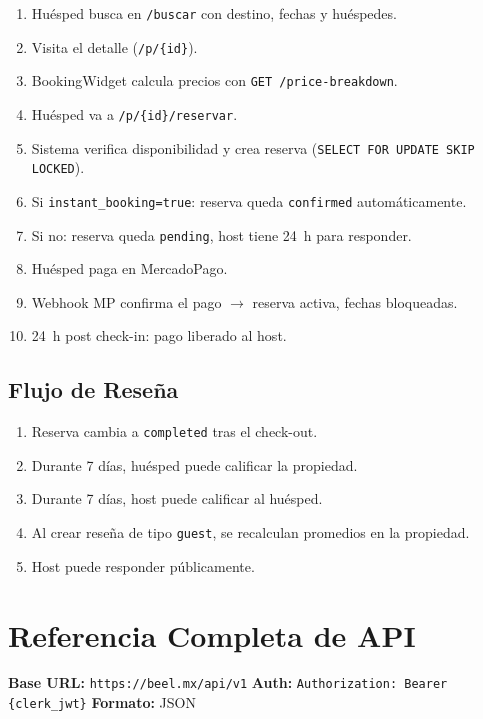 \documentclass[12pt,a4paper]{report}
\begin{document}
\begin{enumerate}[leftmargin=*]
  \item Hu\'esped busca en \texttt{/buscar} con destino, fechas y hu\'espedes.
  \item Visita el detalle (\texttt{/p/\{id\}}).
  \item BookingWidget calcula precios con \texttt{GET /price-breakdown}.
  \item Hu\'esped va a \texttt{/p/\{id\}/reservar}.
  \item Sistema verifica disponibilidad y crea reserva (\texttt{SELECT FOR UPDATE SKIP LOCKED}).
  \item Si \texttt{instant\_booking=true}: reserva queda \texttt{confirmed} autom\'aticamente.
  \item Si no: reserva queda \texttt{pending}, host tiene 24~h para responder.
  \item Hu\'esped paga en MercadoPago.
  \item Webhook MP confirma el pago $\rightarrow$ reserva activa, fechas bloqueadas.
  \item 24~h post check-in: pago liberado al host.
\end{enumerate}

\section{Flujo de Rese\~na}

\begin{enumerate}[leftmargin=*]
  \item Reserva cambia a \texttt{completed} tras el check-out.
  \item Durante 7 d\'ias, hu\'esped puede calificar la propiedad.
  \item Durante 7 d\'ias, host puede calificar al hu\'esped.
  \item Al crear rese\~na de tipo \texttt{guest}, se recalculan promedios en la propiedad.
  \item Host puede responder p\'ublicamente.
\end{enumerate}

\chapter{Referencia Completa de API}

\textbf{Base URL:} \texttt{https://beel.mx/api/v1} \quad
\textbf{Auth:} \texttt{Authorization: Bearer \{clerk\_jwt\}} \quad
\textbf{Formato:} JSON
\end{document}
